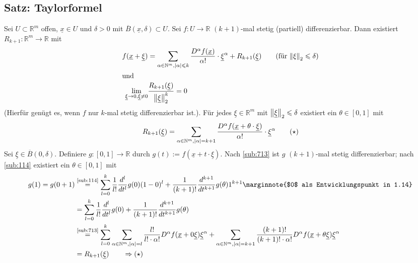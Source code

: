 \subsection{Satz: Taylorformel} %
\label{sub:714}
Sei $U \subset \mathds{R}^m$ offen, $\underline{x} \in U$ und $\delta >0$ mit $\overline{B}(\underline{x}, \delta ) \subset U$. Sei $f : U  \to \mathds{R}$ $(k+1)$-mal
stetig (partiell) differenzierbar. Dann existiert $R_{k+1} : \mathds{R}^m \to \mathds{R}$ mit 
\begin{align*}
	f( \underline{x} + \underline{\xi}) &= \sum_{\alpha \in \mathds{N}^m, \abs*{\alpha} \le k } \frac{D^\alpha f(\underline{x})}{ \alpha !} \cdot \underline{\xi}^\alpha
	+ R_{k+1}(\underline{\xi}) \tag{für $\norm[2]{\xi} \le \delta  $} \\
	\intertext{und} \lim_{ \underline{\xi} \to 0  , \underline{\xi} \not= 0} &\frac{R_{k+1} (\underline{\xi})}{\norm[2]{\underline{\xi}}^k } = 0  
\end{align*}
(Hierfür genügt es, wenn $f$ nur $k$-mal stetig differenzierbar ist.). Für jedes $\underline{\xi} \in \mathds{R}^m$ mit $\norm[2]{\underline{\xi}} \le \delta  $ existiert
ein $\theta \in [0,1]$ mit
\[
	R_{k+1} (\underline{\xi}) = \sum_{\alpha \in \mathds{N}^m, \abs*{\alpha} = k+1 } \frac{D^\alpha f ( \underline{x} + \theta \cdot \underline{\xi}) }{\alpha !} \cdot \underline{\xi}^\alpha \tag{$\star$}
\]
Sei $\underline{\xi} \in \overline{B}(0, \delta)$. Definiere $g : [0,1] \to \mathds{R}$ durch $g(t) := f(\underline{x} + t \cdot \underline{\xi})$. Nach \ref{sub:713} ist
$g$ $(k+1)$-mal stetig differenzierbar; nach \ref{sub:114} existiert ein $\theta \in [0,1]$ mit 
\begin{align*}
	g(1) = g(0+1) &\stackrel{\text{\ref{sub:114}}}{=} \sum_{l=0}^{k} \frac{1}{l!} \frac{d^l}{d t^l} g(0) (1-0)^l + \frac{1}{(k+1)!} \frac{d^{k+1}}{d t^{k+1}} g(\theta) 1^{k+1} \marginnote{$0$ als Entwicklungspunkt in 1.14} \\
	&= \sum_{l=0}^{k}  \frac{1}{l!} \frac{d^l}{d t^l} g(0) + \frac{1}{(k+1)!} \frac{d^{k+1}}{d t^{k+1}} g(\theta)   \\
	&\stackrel{\text{\ref{sub:713}}}{=} \sum_{l=0}^{k} \sum_{\alpha \in \mathds{N}^m, \abs*{\alpha}=l } \frac{l!}{ l! \cdot \alpha !} D^\alpha f( \underline{x} + 0 
	\underline{\xi}) \underline{\xi}^\alpha   + \sum_{\alpha \in \mathds{N}^m, \abs*{\alpha} = k+1 } \frac{(k+1)!}{(k+1)! \cdot \alpha!}  D^\alpha f 
	(\underline{x} + \theta \underline{\xi}) \underline{\xi}^\alpha \\
	&= R_{k+1}(\underline{\xi}) \qquad \Rightarrow (\star)
\end{align*}
